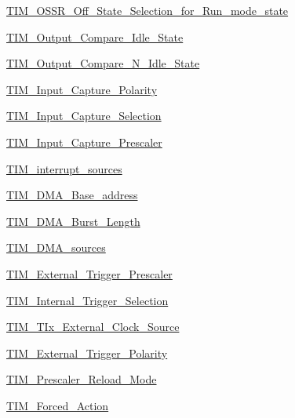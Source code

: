 \begin{DoxyCompactItemize}
\item 
\hyperlink{group___t_i_m___o_s_s_r___off___state___selection__for___run__mode__state}{T\+I\+M\+\_\+\+O\+S\+S\+R\+\_\+\+Off\+\_\+\+State\+\_\+\+Selection\+\_\+for\+\_\+\+Run\+\_\+mode\+\_\+state}
\item 
\hyperlink{group___t_i_m___output___compare___idle___state}{T\+I\+M\+\_\+\+Output\+\_\+\+Compare\+\_\+\+Idle\+\_\+\+State}
\item 
\hyperlink{group___t_i_m___output___compare___n___idle___state}{T\+I\+M\+\_\+\+Output\+\_\+\+Compare\+\_\+\+N\+\_\+\+Idle\+\_\+\+State}
\item 
\hyperlink{group___t_i_m___input___capture___polarity}{T\+I\+M\+\_\+\+Input\+\_\+\+Capture\+\_\+\+Polarity}
\item 
\hyperlink{group___t_i_m___input___capture___selection}{T\+I\+M\+\_\+\+Input\+\_\+\+Capture\+\_\+\+Selection}
\item 
\hyperlink{group___t_i_m___input___capture___prescaler}{T\+I\+M\+\_\+\+Input\+\_\+\+Capture\+\_\+\+Prescaler}
\item 
\hyperlink{group___t_i_m__interrupt__sources}{T\+I\+M\+\_\+interrupt\+\_\+sources}
\item 
\hyperlink{group___t_i_m___d_m_a___base__address}{T\+I\+M\+\_\+\+D\+M\+A\+\_\+\+Base\+\_\+address}
\item 
\hyperlink{group___t_i_m___d_m_a___burst___length}{T\+I\+M\+\_\+\+D\+M\+A\+\_\+\+Burst\+\_\+\+Length}
\item 
\hyperlink{group___t_i_m___d_m_a__sources}{T\+I\+M\+\_\+\+D\+M\+A\+\_\+sources}
\item 
\hyperlink{group___t_i_m___external___trigger___prescaler}{T\+I\+M\+\_\+\+External\+\_\+\+Trigger\+\_\+\+Prescaler}
\item 
\hyperlink{group___t_i_m___internal___trigger___selection}{T\+I\+M\+\_\+\+Internal\+\_\+\+Trigger\+\_\+\+Selection}
\item 
\hyperlink{group___t_i_m___t_ix___external___clock___source}{T\+I\+M\+\_\+\+T\+Ix\+\_\+\+External\+\_\+\+Clock\+\_\+\+Source}
\item 
\hyperlink{group___t_i_m___external___trigger___polarity}{T\+I\+M\+\_\+\+External\+\_\+\+Trigger\+\_\+\+Polarity}
\item 
\hyperlink{group___t_i_m___prescaler___reload___mode}{T\+I\+M\+\_\+\+Prescaler\+\_\+\+Reload\+\_\+\+Mode}
\item 
\hyperlink{group___t_i_m___forced___action}{T\+I\+M\+\_\+\+Forced\+\_\+\+Action}
\item 

\end{DoxyCompactItemize}
